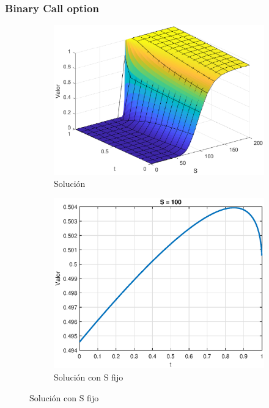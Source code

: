 \subsubsection{Binary Call option}
\begin{figure}[H]
    \centering
    \begin{subfigure}[b]{0.35\linewidth}
        \includegraphics[width=\linewidth]{Imagenes/6_Sols/Binary_Call/BinaryCall3D.eps}
        \caption{Solución}
    \end{subfigure}
    \begin{subfigure}[b]{0.35\linewidth}
        \includegraphics[width=\linewidth]{Imagenes/6_Sols/Binary_Call/BinaryCallSFijo.eps}
        \caption{Solución con S fijo}

\end{subfigure}
\end{figure}
